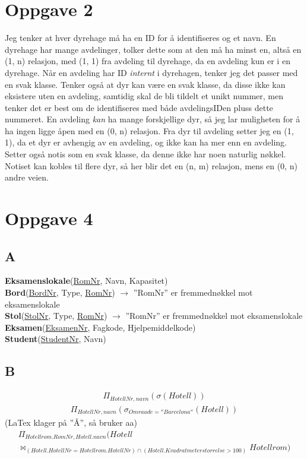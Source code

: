 \documentclass[12pt,a4paper]{article}
\begin{document}
	\section{Oppgave 2}
	Jeg tenker at hver dyrehage må ha en ID for å identifiseres og et navn. En dyrehage har mange avdelinger, tolker dette som at den må ha minst en, altså en (1, n) relasjon, med (1, 1) fra avdeling til dyrehage, da en avdeling kun er i en dyrehage. Når en avdeling har ID \textit{internt} i dyrehagen, tenker jeg det passer med en svak klasse. Tenker også at dyr kan være en svak klasse, da disse ikke kan eksistere uten en avdeling, samtidig skal de bli tildelt et unikt nummer, men tenker det er best om de identifiseres med både avdelingsIDen pluss dette nummeret. En avdeling \textit{kan} ha mange forskjellige dyr, så jeg lar muligheten for å ha ingen ligge åpen med en (0, n) relasjon. Fra dyr til avdeling setter jeg en (1, 1), da et dyr er avhengig av en avdeling, og ikke kan ha mer enn en avdeling. Setter også notis som en svak klasse, da denne ikke har noen naturlig nøkkel. Notiset kan kobles til flere dyr, så her blir det en (n, m) relasjon, mens en (0, n) andre veien. 
	
	\section{Oppgave 4}
	\subsection{A}
		\textbf{Eksamenslokale}(\underline{RomNr}, Navn, Kapasitet)\\
		\textbf{Bord}(\underline{BordNr}, Type, \underline{RomNr}) $\rightarrow$ ''RomNr'' er fremmednøkkel mot eksamenslokale\\
		\textbf{Stol}(\underline{StolNr}, Type, \underline{RomNr}) $\rightarrow$  ''RomNr'' er fremmednøkkel mot eksamenslokale\\
		\textbf{Eksamen}(\underline{EksamenNr}, Fagkode, Hjelpemiddelkode)\\
		\textbf{Student}(\underline{StudentNr}, Navn)
		
	\subsection{B}
			\begin{multline}
				\Pi_{HotellNr, navn}(\sigma(Hotell))
			\end{multline}
			\begin{multline}
				\Pi_{HotellNr, navn}(\sigma_{Omraade = ''Barcelona''}(Hotell))
			\end{multline}
			(LaTex klager på ''Å'', så bruker aa)		
			\begin{multline}
				\Pi_{Hotellrom.RomNr, Hotell.navn}(Hotell \\ 
				\Join_{(Hotell.HotellNr = Hotellrom.HotellNr) \cap (Hotell.Kvadratmeterstorrelse > 100)} Hotellrom)
			\end{multline}
\end{document}
